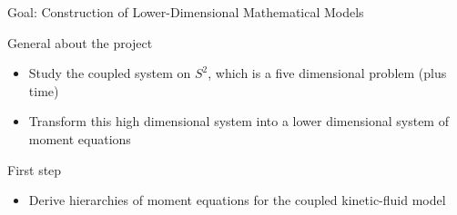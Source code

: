 \begin{frame}{Goal: Construction of Lower-Dimensional Mathematical Models}
	\scriptsize
	\begin{block}{General about the project}
		\begin{itemize}
			\item <1->  Study the coupled system on $S^2$, which is a five dimensional problem (plus time)
			\item <2->  Transform this high dimensional system into a lower dimensional system of moment equations
		\end{itemize}
	\end{block}
	\begin{block}{First step}
		\begin{itemize}
			\item <3-> Derive hierarchies of moment equations for the coupled kinetic-fluid model
		\end{itemize}
	\end{block}
\end{frame}
